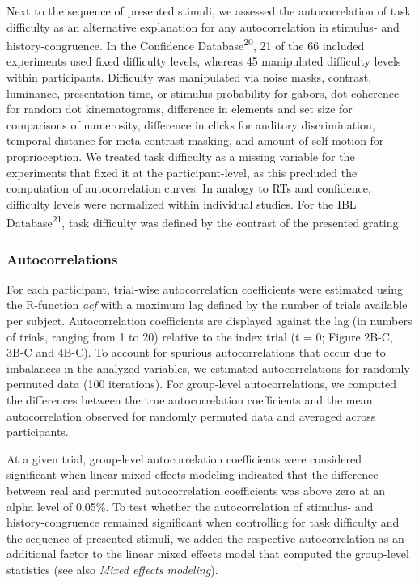 \documentclass[
]{article}
\begin{document}
Next to the sequence of presented stimuli, we assessed the
autocorrelation of task difficulty as an alternative explanation for any
autocorrelation in stimulus- and history-congruence. In the Confidence
Database\textsuperscript{20}, 21 of the 66 included experiments used
fixed difficulty levels, whereas 45 manipulated difficulty levels within
participants. Difficulty was manipulated via noise masks, contrast,
luminance, presentation time, or stimulus probability for gabors, dot
coherence for random dot kinematograms, difference in elements and set
size for comparisons of numerosity, difference in clicks for auditory
discrimination, temporal distance for meta-contrast masking, and amount
of self-motion for proprioception. We treated task difficulty as a
missing variable for the experiments that fixed it at the
participant-level, as this precluded the computation of autocorrelation
curves. In analogy to RTs and confidence, difficulty levels were
normalized within individual studies. For the IBL
Database\textsuperscript{21}, task difficulty was defined by the
contrast of the presented grating.

\hypertarget{autocorrelations}{%
\subsubsection{Autocorrelations}\label{autocorrelations}}

For each participant, trial-wise autocorrelation coefficients were
estimated using the R-function \emph{acf} with a maximum lag defined by
the number of trials available per subject. Autocorrelation coefficients
are displayed against the lag (in numbers of trials, ranging from 1 to
20) relative to the index trial (t = 0; Figure 2B-C, 3B-C and 4B-C). To
account for spurious autocorrelations that occur due to imbalances in
the analyzed variables, we estimated autocorrelations for randomly
permuted data (100 iterations). For group-level autocorrelations, we
computed the differences between the true autocorrelation coefficients
and the mean autocorrelation observed for randomly permuted data and
averaged across participants.

At a given trial, group-level autocorrelation coefficients were
considered significant when linear mixed effects modeling indicated that
the difference between real and permuted autocorrelation coefficients
was above zero at an alpha level of 0.05\%. To test whether the
autocorrelation of stimulus- and history-congruence remained significant
when controlling for task difficulty and the sequence of presented
stimuli, we added the respective autocorrelation as an additional factor
to the linear mixed effects model that computed the group-level
statistics (see also \emph{Mixed effects modeling}).
\end{document}
